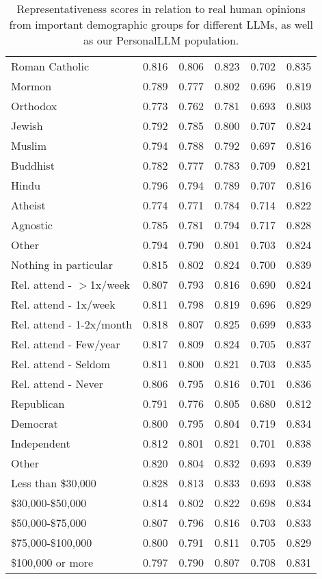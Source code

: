\begin{table}[!ht]
\begin{tabular}{lccccc}
Roman Catholic & 0.816 & 0.806 & 0.823 & 0.702 & 0.835 \\
Mormon & 0.789 & 0.777 & 0.802 & 0.696 & 0.819 \\
Orthodox & 0.773 & 0.762 & 0.781 & 0.693 & 0.803 \\
Jewish & 0.792 & 0.785 & 0.800 & 0.707 & 0.824 \\
Muslim & 0.794 & 0.788 & 0.792 & 0.697 & 0.816 \\
Buddhist & 0.782 & 0.777 & 0.783 & 0.709 & 0.821 \\
Hindu & 0.796 & 0.794 & 0.789 & 0.707 & 0.816 \\
Atheist & 0.774 & 0.771 & 0.784 & 0.714 & 0.822 \\
Agnostic & 0.785 & 0.781 & 0.794 & 0.717 & 0.828 \\
Other & 0.794 & 0.790 & 0.801 & 0.703 & 0.824 \\
Nothing in particular & 0.815 & 0.802 & 0.824 & 0.700 & 0.839 \\
Rel. attend - $>$1x/week & 0.807 & 0.793 & 0.816 & 0.690 & 0.824 \\
Rel. attend - 1x/week & 0.811 & 0.798 & 0.819 & 0.696 & 0.829 \\
Rel. attend - 1-2x/month & 0.818 & 0.807 & 0.825 & 0.699 & 0.833 \\
Rel. attend - Few/year & 0.817 & 0.809 & 0.824 & 0.705 & 0.837 \\
Rel. attend - Seldom & 0.811 & 0.800 & 0.821 & 0.703 & 0.835 \\
Rel. attend - Never & 0.806 & 0.795 & 0.816 & 0.701 & 0.836 \\
Republican & 0.791 & 0.776 & 0.805 & 0.680 & 0.812 \\
Democrat & 0.800 & 0.795 & 0.804 & 0.719 & 0.834 \\
Independent & 0.812 & 0.801 & 0.821 & 0.701 & 0.838 \\
Other & 0.820 & 0.804 & 0.832 & 0.693 & 0.839 \\
Less than \$30,000 & 0.828 & 0.813 & 0.833 & 0.693 & 0.838 \\
\$30,000-\$50,000 & 0.814 & 0.802 & 0.822 & 0.698 & 0.834 \\
\$50,000-\$75,000 & 0.807 & 0.796 & 0.816 & 0.703 & 0.833 \\
\$75,000-\$100,000 & 0.800 & 0.791 & 0.811 & 0.705 & 0.829 \\
\$100,000 or more & 0.797 & 0.790 & 0.807 & 0.708 & 0.831 \\
    \bottomrule
    \end{tabular}
    \caption{Representativeness scores in relation to real human opinions from important demographic groups for different LLMs, as well as our \textsf{PersonalLLM} population.}
    \label{tab:opinion_qa_full}
\end{table}

